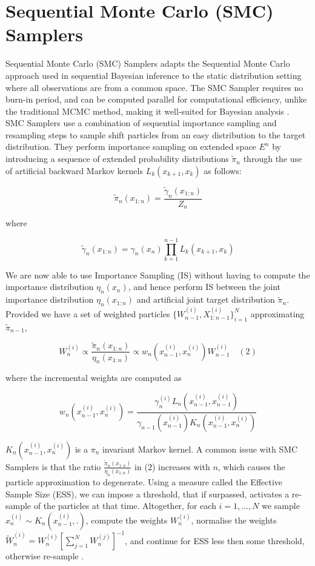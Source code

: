 \documentclass[12pt]{elsarticle}
\begin{document}
\section*{Sequential Monte Carlo (SMC) Samplers}

Sequential Monte Carlo (SMC) Samplers adapts the Sequential Monte Carlo approach used in sequential Bayesian inference to the static distribution setting where all observations are from a common space. The SMC Sampler requires no burn-in period, and can be computed parallel for computational efficiency, unlike the traditional MCMC method, making it well-suited for Bayesian analysis \cite{Bishop2007}. \\

SMC Samplers use a combination of sequential importance sampling and resampling steps to sample shift particles from an easy distribution to the target distribution. They perform importance sampling on extended space $E^n$ by introducing a sequence of extended probability distributions $\tilde{\pi}_n$ through the use of artificial backward Markov kernels $L_k(x_{k+1},x_k)$ as follows:

\[
\tilde{\pi}_n(x_{1:n}) = \frac{\tilde{\gamma}_n(x_{1:n})}{Z_n}
\]

where 

\[
\tilde{\gamma}_n(x_{1:n}) = \gamma_n(x_n) \prod_{k=1}^{n-1} L_k(x_{k+1},x_k)
\]

We are now able to use Importance Sampling (IS) without having to compute the importance distribution $\eta_n(x_n)$, and hence perform IS between the joint importance distribution $\eta_n(x_{1:n})$ and artificial joint target distribution $\tilde{\pi}_n$. Provided we have a set of weighted particles $\{W_{n-1}^{(i)}, X_{1:n-1}^{(i)}\}_{i=1}^N$ approximating $\tilde{\pi}_{n-1}$,

\[
W_n^{(i)} \propto \frac{\tilde{\pi}_n(x_{1:n})}{\eta_n(x_{1:n})} \propto w_n(x_{n-1}^{(i)}, x_n^{(i)})W_{n-1}^{(i)} \quad (2)
\]

where the incremental weights are computed as

\[
w_n(x_{n-1}^{(i)}, x_n^{(i)}) = \frac{\gamma_n^{(i)}L_{n}(x_{n-1}^{(i)}, x_{n-1}^{(i)})}{\gamma_{n-1}(x_{n-1}^{(i)}) K_n(x_{n-1}^{(i)}, x_n^{(i)})}
\]

$K_n(x_{n-1}^{(i)}, x_n^{(i)})$ is a $\pi_n$ invariant Markov kernel. A common issue with SMC Samplers is that the ratio $\frac{\tilde{\pi}_n(x_{1:n})}{\eta_n(x_{1:n})}$ in (2) increases with $n$, which causes the particle approximation to degenerate. Using a measure called the Effective Sample Size (ESS), we can impose a threshold, that if surpassed, activates a re-sample of the particles at that time. Altogether, for each $i = 1, \dots, N$ we sample $x_n^{(i)} \sim K_n(x_{n-1}^{(i)}, .)$, compute the weights $W_n^{(i)}$, normalise the weights $\tilde{W}_n^{(i)} = W_n^{(i)}[\sum_{j=1}^N W_n^{(j)}]^{-1}$, and continue for ESS less then some threshold, otherwise re-sample \cite{DelMoral2005}.
\end{document}
